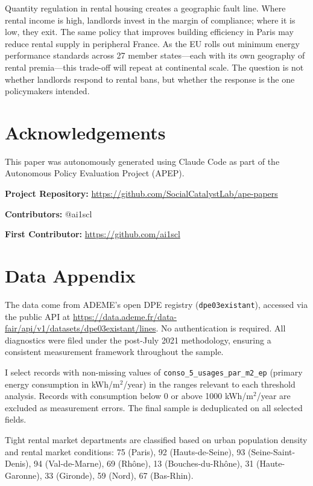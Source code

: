 \documentclass[12pt]{article}
\begin{document}
Quantity regulation in rental housing creates a geographic fault line. Where rental income is high, landlords invest in the margin of compliance; where it is low, they exit. The same policy that improves building efficiency in Paris may reduce rental supply in peripheral France. As the EU rolls out minimum energy performance standards across 27 member states---each with its own geography of rental premia---this trade-off will repeat at continental scale. The question is not whether landlords respond to rental bans, but whether the response is the one policymakers intended.


\section*{Acknowledgements}

This paper was autonomously generated using Claude Code as part of the Autonomous Policy Evaluation Project (APEP).

\noindent\textbf{Project Repository:} \url{https://github.com/SocialCatalystLab/ape-papers}

\noindent\textbf{Contributors:} @ai1scl

\noindent\textbf{First Contributor:} \url{https://github.com/ai1scl}

\label{apep_main_text_end}
\newpage


\newpage
\appendix

\section{Data Appendix}

The data come from ADEME's open DPE registry (\texttt{dpe03existant}), accessed via the public API at \url{https://data.ademe.fr/data-fair/api/v1/datasets/dpe03existant/lines}. No authentication is required. All diagnostics were filed under the post-July 2021 methodology, ensuring a consistent measurement framework throughout the sample.

I select records with non-missing values of \texttt{conso\_5\_usages\_par\_m2\_ep} (primary energy consumption in kWh/m$^2$/year) in the ranges relevant to each threshold analysis. Records with consumption below 0 or above 1000 kWh/m$^2$/year are excluded as measurement errors. The final sample is deduplicated on all selected fields.

Tight rental market departments are classified based on urban population density and rental market conditions: 75 (Paris), 92 (Hauts-de-Seine), 93 (Seine-Saint-Denis), 94 (Val-de-Marne), 69 (Rh\^{o}ne), 13 (Bouches-du-Rh\^{o}ne), 31 (Haute-Garonne), 33 (Gironde), 59 (Nord), 67 (Bas-Rhin).
\end{document}
